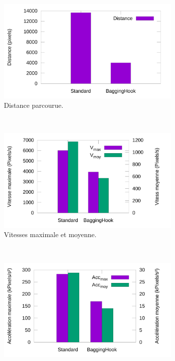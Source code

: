 	\begin{figure}[htbp]
		\begin{subfigure}[t]{0.49\textwidth}
			\centering
			\includegraphics[width=\textwidth]{figures/ch5/distHisto}
			\caption{Distance parcourue.}
			\label{fig:distHisto}
		\end{subfigure}
		~
		\begin{subfigure}[t]{0.49\textwidth}
			\centering
			\includegraphics[width=\textwidth]{figures/ch5/speedHisto}
			\caption{Vitesses maximale et moyenne.}
			\label{fig:speedHisto}
		\end{subfigure}
		~
		\begin{subfigure}[t]{0.49\textwidth}
			\centering
			\includegraphics[width=\textwidth]{figures/ch5/accelHisto}

\end{subfigure}
\end{figure}

